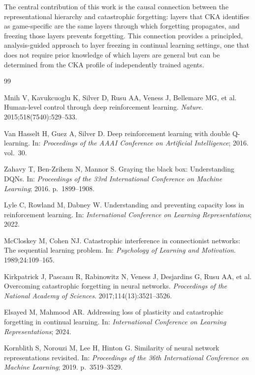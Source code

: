 \documentclass[a4paper]{article}
\begin{document}
The central contribution of this work is the causal connection between the representational hierarchy and catastrophic forgetting: layers that CKA identifies as game-specific are the same layers through which forgetting propagates, and freezing those layers prevents forgetting. This connection provides a principled, analysis-guided approach to layer freezing in continual learning settings, one that does not require prior knowledge of which layers are general but can be determined from the CKA profile of independently trained agents.

\newpage
\begin{thebibliography}{99}

Mnih V, Kavukcuoglu K, Silver D, Rusu AA, Veness J, Bellemare MG, et al.
Human-level control through deep reinforcement learning.
\textit{Nature}. 2015;518(7540):529--533.

Van Hasselt H, Guez A, Silver D.
Deep reinforcement learning with double Q-learning.
In: \textit{Proceedings of the AAAI Conference on Artificial Intelligence}; 2016. vol.~30.

Zahavy T, Ben-Zrihem N, Mannor S.
Graying the black box: Understanding DQNs.
In: \textit{Proceedings of the 33rd International Conference on Machine Learning}; 2016. p.~1899--1908.

Lyle C, Rowland M, Dabney W.
Understanding and preventing capacity loss in reinforcement learning.
In: \textit{International Conference on Learning Representations}; 2022.

McCloskey M, Cohen NJ.
Catastrophic interference in connectionist networks: The sequential learning problem.
In: \textit{Psychology of Learning and Motivation}. 1989;24:109--165.

Kirkpatrick J, Pascanu R, Rabinowitz N, Veness J, Desjardins G, Rusu AA, et al.
Overcoming catastrophic forgetting in neural networks.
\textit{Proceedings of the National Academy of Sciences}. 2017;114(13):3521--3526.

Elsayed M, Mahmood AR.
Addressing loss of plasticity and catastrophic forgetting in continual learning.
In: \textit{International Conference on Learning Representations}; 2024.

Kornblith S, Norouzi M, Lee H, Hinton G.
Similarity of neural network representations revisited.
In: \textit{Proceedings of the 36th International Conference on Machine Learning}; 2019. p.~3519--3529.


\end{thebibliography}
\end{document}
